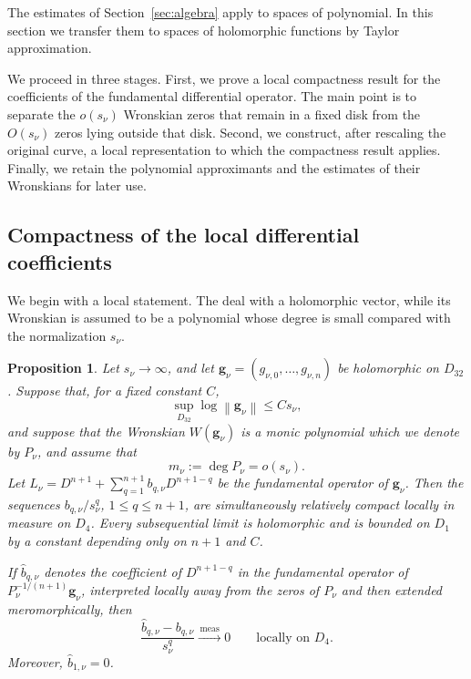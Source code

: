 \documentclass[12pt,letterpaper,reqno]{amsart}
\newtheorem{prop}[thm]{Proposition}
\theoremstyle{definition}
\numberwithin{equation}{section}
\newcommand{\norm}[1]{\left\lVert#1\right\rVert}
\newcommand{\convmeas}{\xrightarrow{\,\mathrm{meas}\,}}
\newcommand{\gv}{\bm g}
\begin{document}
The estimates of Section~\ref{sec:algebra} apply to spaces
of polynomial. 
In this section we transfer them to spaces of holomorphic
functions by
Taylor approximation.

We proceed in three stages. First, we prove a local compactness result
for the coefficients of the fundamental differential operator. The main
point is to separate the \(o(s_\nu)\) Wronskian zeros that remain in a
fixed disk from the \(O(s_\nu)\) zeros lying outside that disk. Second,
we construct, after rescaling the original curve, a local representation
to which the compactness result applies. Finally, we retain the
polynomial approximants and the estimates of their Wronskians for later
use.


\subsection{Compactness of the local differential coefficients}
\label{sec:local-coefficient-compactness}

We begin with a local statement. The deal with a holomorphic vector, while its
Wronskian is assumed to be a polynomial whose degree is small compared
with the normalization \(s_\nu\).

\begin{prop}\label{prop:localcompact}
Let \(s_\nu\to\infty\), and let
\(\gv_\nu=(g_{\nu,0},\ldots,g_{\nu,n})\) be holomorphic on \(D_{32}\).
Suppose that, for a fixed constant \(C\),
\begin{equation}\label{eq:localhyp}
 \sup_{D_{32}}\log\norm{\gv_\nu}\leq Cs_\nu,
\end{equation}
and suppose that the Wronskian $W(\gv_\nu)$ is a monic polynomial which we denote
by $P_\nu$, and assume that
\begin{equation}
 m_\nu:=\deg P_\nu=o(s_\nu).
\end{equation}
Let
\(L_\nu=D^{n+1}+\sum_{q=1}^{n+1}b_{q,\nu}D^{n+1-q}\)
be the fundamental operator of \(\gv_\nu\).
Then the sequences \(b_{q,\nu}/s_\nu^q\), \(1\leq q\leq n+1\), are
simultaneously relatively compact locally in measure on \(D_4\).
Every subsequential limit is holomorphic and is bounded on \(D_1\) by
a constant depending only on \({n+1}\) and \(C\).

If \(\widehat b_{q,\nu}\) denotes the coefficient of \(D^{n+1-q}\) in
the fundamental operator of \(P_\nu^{-1/(n+1)}\gv_\nu\), interpreted
locally away from the zeros of \(P_\nu\) and then extended
meromorphically, then
\begin{equation}\label{eq:gaugecomparison}
 \frac{\widehat b_{q,\nu}-b_{q,\nu}}{s_\nu^q}
 \convmeas0
 \qquad\text{locally on }D_4.
\end{equation}
Moreover, \(\widehat b_{1,\nu}=0\).
\end{prop}
\end{document}
